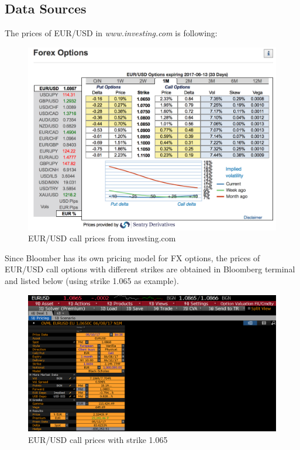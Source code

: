 \appendix
\chapter{}
\section{Data Sources}

The prices of EUR/USD in \textit{www.investing.com} is following:
\begin{figure}[htb]
	\centering
	\includegraphics[scale=0.4]{./Testing-data/EURUSD_1M_investing.png} 
	\caption{EUR/USD call prices from investing.com}
	\label{fig:prices-investing.com} %
\end{figure}

Since Bloomber has its own pricing model for FX options, the prices of EUR/USD call options with different strikes are obtained in Bloomberg terminal and listed below (using strike 1.065 as example).

\begin{figure}[htb]
	\centering
	\includegraphics[scale=0.3]{./Testing-data/Price-Bloomberg/EURUSD1065.PNG} 
	\caption{EUR/USD call prices with strike 1.065}
	
	\label{fig:prices-investing.com} %
\end{figure}


